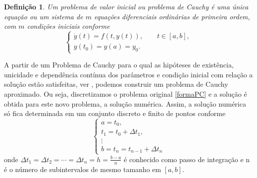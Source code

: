 \documentclass[amsmath,amssymb,floatfix]{revtex4}
\newtheorem{defi}{Definição}[section]
\begin{document}
\begin{defi}
Um problema de valor inicial ou problema de Cauchy é uma única equação ou um sistema de $m$ equações diferenciais ordinárias de primeira ordem, com $m$ condições iniciais conforme
\begin{equation}\label{formaPC}
\begin{cases}
\dot{y}(t)= f(t,y(t)), \qquad t \in [a,b], \\ 
 y(t_0)= y(a) = y_0.
\end{cases}
\end{equation}
\end{defi}  
A partir de um Problema de Cauchy para o qual as hipóteses de existência, unicidade e dependência contínua dos parâmetros e condição inicial com relação a solução estão satisfeitas, ver \cite{numerical}, podemos construir um problema de Cauchy aproximado. Ou seja, discretizamos o problema original \eqref{formaPC} e a solução é obtida para este novo problema, a solução numérica. Assim, a solução numérica só fica determinada em um conjunto discreto e finito de pontos conforme
\begin{equation*}
\begin{cases}
a=t_0, \\
t_1 = t_0 +\Delta t_1, \\
\vdots \\
b = t_n=t_{n-1} +\Delta t_n
\end{cases}
\end{equation*}
onde $\Delta t_1 = \Delta t_2 = \cdots = \Delta t_n = h = \frac{b-a}{n}$ é conhecido como passo de integração e n é o número de subintervalos de mesmo tamanho em $[a, b]$.
\end{document}
